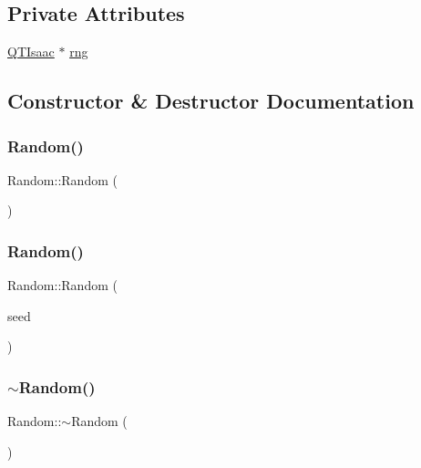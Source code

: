 \subsection*{Private Attributes}
\begin{DoxyCompactItemize}
\item 
\hyperlink{classQTIsaac}{Q\+T\+Isaac} $\ast$ \hyperlink{classRandom_ac7e446b9b431641c729a6d78ab747781}{rng}
\end{DoxyCompactItemize}


\subsection{Constructor \& Destructor Documentation}
\mbox{\label{classRandom_acb76b49c3903a3c4fb67fd216341f08d}} 
\subsubsection{\texorpdfstring{Random()}{Random()}\hspace{0.1cm}{\footnotesize\ttfamily [1/2]}}
{\footnotesize\ttfamily Random\+::\+Random (\begin{DoxyParamCaption}{ }\end{DoxyParamCaption})}

\mbox{\label{classRandom_a828e4af348ebff33c0785980a4ff4d38}} 
\subsubsection{\texorpdfstring{Random()}{Random()}\hspace{0.1cm}{\footnotesize\ttfamily [2/2]}}
{\footnotesize\ttfamily Random\+::\+Random (\begin{DoxyParamCaption}\item[{Crypto\+P\+P\+::\+Sec\+Byte\+Block \&}]{seed }\end{DoxyParamCaption})}

\mbox{\label{classRandom_ac0d4eaf1f32df4600eb321cb8dbc0c55}} 
\subsubsection{\texorpdfstring{$\sim$\+Random()}{~Random()}}
{\footnotesize\ttfamily Random\+::$\sim$\+Random (\begin{DoxyParamCaption}{ }\end{DoxyParamCaption})\hspace{0.3cm}{\ttfamily [virtual]}}



